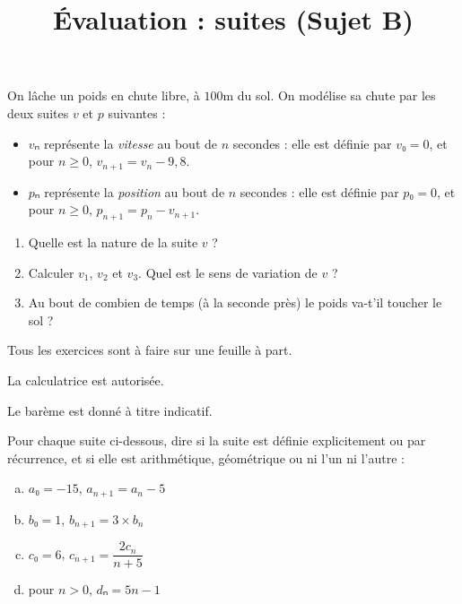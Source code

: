 \documentclass[
	classe=$1^{ere}STI2D$
]{évaluation}
\begin{document}
\begin{exercice}[4]
	On lâche un poids en chute libre, à $100$m du sol. On modélise sa chute par les deux suites $v$ et $p$ suivantes :

	\begin{itemize}
		\item $vₙ$ représente la \textit{vitesse} au bout de $n$ secondes : elle est définie par $v₀ = 0$, et pour $n ≥ 0$, $v_{n+1} = v_n - 9,8$.
		\item $pₙ$ représente la \textit{position} au bout de $n$ secondes : elle est définie par $p₀ = 0$, et pour $n ≥ 0$, $p_{n+1} = p_n - v_{n+1}$.
	\end{itemize}

	\begin{enumerate}
		\item Quelle est la nature de la suite $v$ ?
		\item Calculer $v_1$, $v_2$ et $v_3$. Quel est le sens de variation de $v$ ?
		\item Au bout de combien de temps (à la seconde près) le poids va-t'il toucher le sol ?
	\end{enumerate}
\end{exercice}

\newpage
\setcounter{exercice}{1}

\title{Évaluation : suites (Sujet B)}
\maketitle

\begin{tcolorbox}
	Tous les exercices sont à faire sur une feuille à part.

	La calculatrice est autorisée.

	Le barème est donné à titre indicatif.
\end{tcolorbox}

\begin{exercice}[4]
	Pour chaque suite ci-dessous, dire si la suite est définie explicitement ou par récurrence, et si elle est arithmétique, géométrique ou ni l'un ni l'autre :
	\begin{multicols}{2}
		\begin{enumerate}[a)]
			\item $a₀ = -15$, $a_{n+1} = a_n - 5$
			\item $b₀ = 1$, $b_{n+1} = 3 × b_n$
			      \columnbreak
			\item $c₀ = 6$, $c_{n+1} = \dfrac{2c_n}{n + 5}$
			\item pour $n > 0$, $dₙ = 5n - 1$
		\end{enumerate}
	\end{multicols}
\end{exercice}
\end{document}

